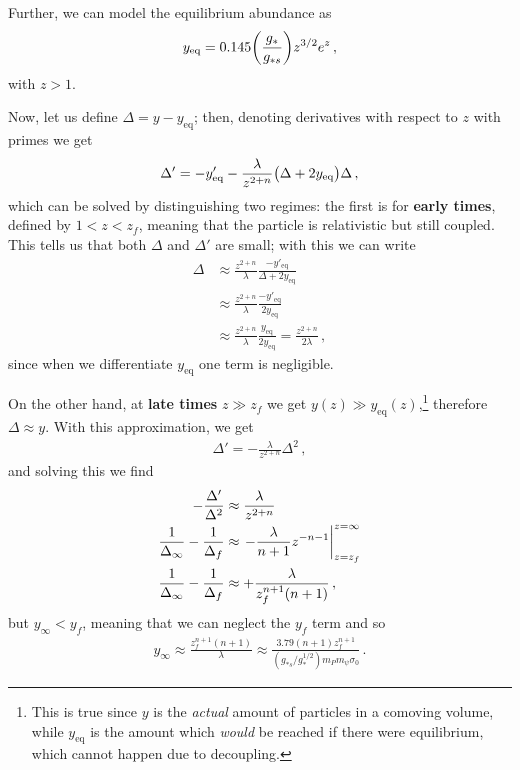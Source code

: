 \documentclass[main.tex]{subfiles}
\begin{document}
Further, we can model the equilibrium abundance as 
%
\begin{align}
y _{\text{eq}} = \num{.145} \qty(\frac{g_*}{g_{*s}}) z^{3/2} e^{z}
\,,
\end{align}
%
with \(z > 1\). 

Now, let us define \(\Delta = y - y _{\text{eq}} \); then, denoting derivatives with respect to \(z\) with primes we get
%
\begin{align}
\Delta' = - y' _{\text{eq}} - \frac{\lambda}{z^{2+n}} \qty(\Delta + 2 y _{\text{eq}}) \Delta 
\,,
\end{align}
%
which can be solved by distinguishing two regimes: the first is for \textbf{early times}, defined by \(1 < z < z_f\), meaning that the particle is relativistic but still coupled.
This tells us that both \(\Delta \) and \(\Delta '\) are small; with this we can write 
%
\begin{align}\label{eq:differential-equation-equilibrium-deviation-boltzmann}
\Delta &\approx \frac{z^{2+n}}{\lambda } \frac{- y' _{\text{eq}}}{\Delta + 2 y _{\text{eq}}}  \\
&\approx \frac{z^{2+n}}{\lambda } \frac{- y' _{\text{eq}}}{2 y _{\text{eq}}}  \\
&\approx \frac{z^{2+n}}{\lambda }
 \frac{y _{\text{eq}}}{2 y _{\text{eq}}} = \frac{z^{2+n}}{2 \lambda }
\,,
\end{align}
%
since when we differentiate \(y _{\text{eq}}\) one term is negligible.

On the other hand, at \textbf{late times} \(z \gg z_f\) we get \(y(z) \gg y _{\text{eq}} (z)\),\footnote{This is true since \(y\) is the \emph{actual} amount of particles in a comoving volume, while \(y _{\text{eq}}\) is the amount which \emph{would} be reached if there were equilibrium, which cannot happen due to decoupling.} therefore \(\Delta \approx y\). 
With this approximation, we get 
%
\begin{align}
\Delta ' = - \frac{\lambda}{z^{2+n}} \Delta^2
\,,
\end{align}
%
and solving this we find 
%
\begin{align}
- \frac{\Delta '}{\Delta^2} &\approx \frac{\lambda }{z^{2 + n}}  \\
\frac{1}{\Delta _\infty } - \frac{1}{\Delta _f} &\approx \eval{- \frac{\lambda}{n+1} z^{-n-1}}_{z = z_f}^{z = \infty } \\
\frac{1}{\Delta_{\infty }} - \frac{1}{\Delta _f} &\approx  + \frac{\lambda }{z_f^{n+1} (n+1) }
\,,
\end{align}
%
but \(y_\infty < y_f\), meaning that we can neglect the \(y_f\) term and so 
%
\begin{align}
y_\infty \approx \frac{z_f^{n+1}(n+1)}{\lambda } \approx
\frac{\num{3.79} (n+1) z_f^{n+1}}{(g_{*s} / g_*^{1/2}) m_P m_\psi \sigma_0 }
\,.
\end{align}
\end{document}
